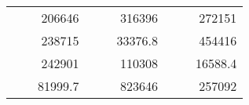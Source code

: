 \begin{table}[H]
\begin{tabular}{|ccrccrccc}
\rowcolor[HTML]{DAE8FC} 
\multicolumn{1}{|c|}{\cellcolor[HTML]{FFFFC7}}                                & \multicolumn{1}{c|}{\cellcolor[HTML]{DAE8FC}}                      & \multicolumn{1}{r|}{\cellcolor[HTML]{DAE8FC}206646}    & \multicolumn{1}{c|}{\cellcolor[HTML]{FFFFC7}}                                & \multicolumn{1}{c|}{\cellcolor[HTML]{DAE8FC}}                       & \multicolumn{1}{r|}{\cellcolor[HTML]{DAE8FC}316396}    & \multicolumn{1}{c|}{\cellcolor[HTML]{FFFFC7}}                                & \multicolumn{1}{c|}{\cellcolor[HTML]{DAE8FC}}                      & \multicolumn{1}{r|}{\cellcolor[HTML]{DAE8FC}272151}    \\ \cline{3-3} \cline{6-6} \cline{9-9} 
\multicolumn{1}{|c|}{\cellcolor[HTML]{FFFFC7}}                                & \multicolumn{1}{c|}{\cellcolor[HTML]{DAE8FC}}                      & \multicolumn{1}{r|}{\cellcolor[HTML]{DDFDFF}238715}    & \multicolumn{1}{c|}{\cellcolor[HTML]{FFFFC7}}                                & \multicolumn{1}{c|}{\cellcolor[HTML]{DAE8FC}}                       & \multicolumn{1}{r|}{\cellcolor[HTML]{DDFDFF}33376.8}   & \multicolumn{1}{c|}{\cellcolor[HTML]{FFFFC7}}                                & \multicolumn{1}{c|}{\cellcolor[HTML]{DAE8FC}}                      & \multicolumn{1}{r|}{\cellcolor[HTML]{DDFDFF}454416}    \\ \cline{3-3} \cline{6-6} \cline{9-9} 
\rowcolor[HTML]{DAE8FC} 
\multicolumn{1}{|c|}{\cellcolor[HTML]{FFFFC7}}                                & \multicolumn{1}{c|}{\cellcolor[HTML]{DAE8FC}}                      & \multicolumn{1}{r|}{\cellcolor[HTML]{DAE8FC}242901}    & \multicolumn{1}{c|}{\cellcolor[HTML]{FFFFC7}}                                & \multicolumn{1}{c|}{\cellcolor[HTML]{DAE8FC}}                       & \multicolumn{1}{r|}{\cellcolor[HTML]{DAE8FC}110308}    & \multicolumn{1}{c|}{\cellcolor[HTML]{FFFFC7}}                                & \multicolumn{1}{c|}{\cellcolor[HTML]{DAE8FC}}                      & \multicolumn{1}{r|}{\cellcolor[HTML]{DAE8FC}16588.4}   \\ \cline{3-3} \cline{6-6} \cline{9-9} 
\multicolumn{1}{|c|}{\cellcolor[HTML]{FFFFC7}}                                & \multicolumn{1}{c|}{\cellcolor[HTML]{DAE8FC}}                      & \multicolumn{1}{r|}{\cellcolor[HTML]{DDFDFF}81999.7}   & \multicolumn{1}{c|}{\cellcolor[HTML]{FFFFC7}}                                & \multicolumn{1}{c|}{\cellcolor[HTML]{DAE8FC}}                       & \multicolumn{1}{r|}{\cellcolor[HTML]{DDFDFF}823646}    & \multicolumn{1}{c|}{\cellcolor[HTML]{FFFFC7}}                                & \multicolumn{1}{c|}{\cellcolor[HTML]{DAE8FC}}                      & \multicolumn{1}{r|}{\cellcolor[HTML]{DDFDFF}257092}    \\ \cline{3-3} \cline{6-6} \cline{9-9} 

\end{tabular}
\end{table}
